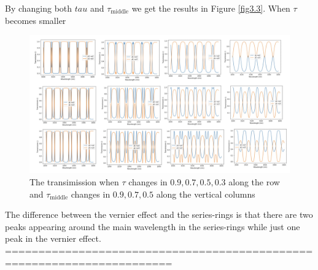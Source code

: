 \documentclass[fontsize=11pt]{scrartcl}
\begin{document}
By changing both $tau$ and $\tau_{\mathrm{middle}}$ we get the results in 
Figure \ref{fig3.3}.
When $\tau$ becomes smaller
\begin{figure}[H]
    \centering
    \includegraphics[width=1\textwidth]{img/fig3.3.png}
    \caption{The transimission when $\tau$ changes in $0.9, 0.7, 0.5, 0.3$
    along the row and $\tau_{\mathrm{middle}}$ changes in $0.9, 0.7, 0.5$ along
    the vertical columns}
    \label{fig3.2}
\end{figure}

The difference between the vernier effect and the series-rings is that
there are two peaks appearing around the main wavelength in the series-rings
while just one peak in the vernier effect.
\pagebreak
=======================================================================
\end{document}
